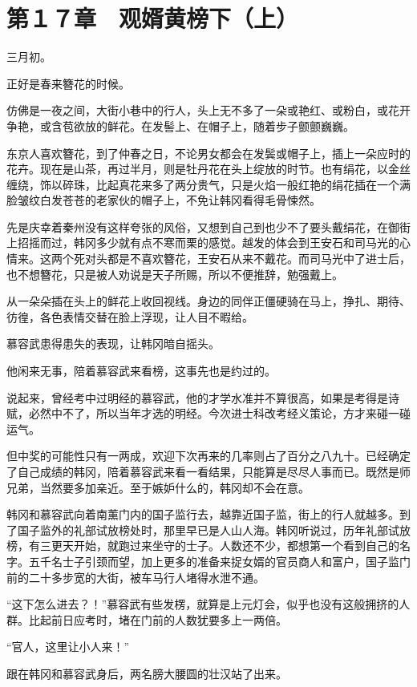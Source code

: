 \section{第１７章　观婿黄榜下（上）}

三月初。

正好是春来簪花的时候。

仿佛是一夜之间，大街小巷中的行人，头上无不多了一朵或艳红、或粉白，或花开争艳，或含苞欲放的鲜花。在发髻上、在帽子上，随着步子颤颤巍巍。

东京人喜欢簪花，到了仲春之日，不论男女都会在发鬓或帽子上，插上一朵应时的花卉。现在是山茶，再过半月，则是牡丹花在头上绽放的时节。也有绢花，以金丝缠绕，饰以碎珠，比起真花来多了两分贵气，只是火焰一般红艳的绢花插在一个满脸皱纹白发苍苍的老家伙的帽子上，不免让韩冈看得毛骨悚然。

先是庆幸着秦州没有这样夸张的风俗，又想到自己到也少不了要头戴绢花，在御街上招摇而过，韩冈多少就有点不寒而栗的感觉。越发的体会到王安石和司马光的心情来。这两个死对头都是不喜欢簪花，王安石从来不戴花。而司马光中了进士后，也不想簪花，只是被人劝说是天子所赐，所以不便推辞，勉强戴上。

从一朵朵插在头上的鲜花上收回视线。身边的同伴正僵硬骑在马上，挣扎、期待、彷徨，各色表情交替在脸上浮现，让人目不暇给。

慕容武患得患失的表现，让韩冈暗自摇头。

他闲来无事，陪着慕容武来看榜，这事先也是约过的。

说起来，曾经考中过明经的慕容武，他的才学水准并不算很高，如果是考得是诗赋，必然中不了，所以当年才选的明经。今次进士科改考经义策论，方才来碰一碰运气。

但中奖的可能性只有一两成，欢迎下次再来的几率则占了百分之八九十。已经确定了自己成绩的韩冈，陪着慕容武来看一看结果，只能算是尽尽人事而已。既然是师兄弟，当然要多加亲近。至于嫉妒什么的，韩冈却不会在意。

韩冈和慕容武向着南薰门内的国子监行去，越靠近国子监，街上的行人就越多。到了国子监外的礼部试放榜处时，那里早已是人山人海。韩冈听说过，历年礼部试放榜，有三更天开始，就跑过来坐守的士子。人数还不少，都想第一个看到自己的名字。五千名士子引颈而望，加上更多的准备来捉女婿的官员商人和富户，国子监门前的二十多步宽的大街，被车马行人堵得水泄不通。

“这下怎么进去？！”慕容武有些发楞，就算是上元灯会，似乎也没有这般拥挤的人群。比起前日应考时，堵在门前的人数犹要多上一两倍。

“官人，这里让小人来！”

跟在韩冈和慕容武身后，两名膀大腰圆的壮汉站了出来。

